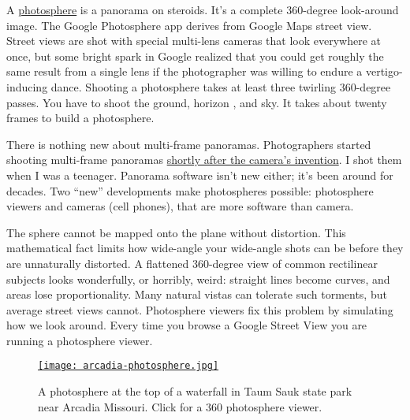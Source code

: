 A
\href{https://www.google.com/maps/about/contribute/photosphere/}{photosphere}
is a panorama on steroids. It's a complete 360-degree look-around image.
The Google Photosphere app derives from Google Maps street view. Street
views are shot with special multi-lens cameras that look everywhere at
once, but some bright spark in Google realized that you could get roughly
the same result from a single lens if the photographer was willing to
endure a vertigo-inducing dance. Shooting a photosphere takes at least
three twirling 360-degree passes. You have to shoot the ground, horizon
, and sky. It takes about twenty frames to build a photosphere.

There is nothing new about multi-frame panoramas. Photographers started
shooting multi-frame panoramas
\href{https://content.lib.washington.edu/panoramweb/history.html}{shortly
after the camera's invention}. I shot them when I was a teenager. Panorama
software isn't new either; it's been around for decades. Two ``new''
developments make photospheres possible: photosphere viewers and cameras
(cell phones), that are more software than camera.





The sphere cannot be mapped onto the plane without distortion. This
mathematical fact limits how wide-angle your wide-angle shots can be
before they are unnaturally distorted. A flattened 360-degree view of
common rectilinear subjects looks wonderfully, or horribly, weird:
straight lines become curves, and areas lose proportionality. Many
natural vistas can tolerate such torments, but average street views
cannot. Photosphere viewers fix this problem by simulating how we look
around. Every time you browse a Google Street View you are running a
photosphere viewer.


\begin{figure}[htbp]
\centering
\href{https://www.google.com/maps/views/view/109459250977988268850/gphoto/6071702564097759170}{\texttt{[image: arcadia-photosphere.jpg]}}
\caption[Photosphere of a waterfall in Taum Sauk park Arcadia Missouri]{A photosphere at the top of a waterfall in Taum Sauk state park near Arcadia Missouri.
Click for a 360 photosphere viewer.}
\label{fig:4832X0}
\end{figure}



